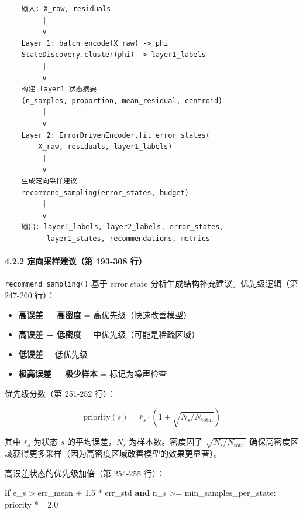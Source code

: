 \documentclass[
  12pt,
]{ctexart}
\newenvironment{Shaded}{}{}
\newcommand{\ControlFlowTok}[1]{\textcolor[rgb]{0.00,0.44,0.13}{\textbf{#1}}}
\newcommand{\FloatTok}[1]{\textcolor[rgb]{0.25,0.63,0.44}{#1}}
\newcommand{\KeywordTok}[1]{\textcolor[rgb]{0.00,0.44,0.13}{\textbf{#1}}}
\newcommand{\NormalTok}[1]{#1}
\newcommand{\OperatorTok}[1]{\textcolor[rgb]{0.40,0.40,0.40}{#1}}
\providecommand{\tightlist}{%
  \setlength{\itemsep}{0pt}\setlength{\parskip}{0pt}}
\begin{document}
\begin{verbatim}
    输入: X_raw, residuals
         |
         v
    Layer 1: batch_encode(X_raw) -> phi
    StateDiscovery.cluster(phi) -> layer1_labels
         |
         v
    构建 layer1 状态摘要
    (n_samples, proportion, mean_residual, centroid)
         |
         v
    Layer 2: ErrorDrivenEncoder.fit_error_states(
        X_raw, residuals, layer1_labels)
         |
         v
    生成定向采样建议
    recommend_sampling(error_states, budget)
         |
         v
    输出: layer1_labels, layer2_labels, error_states,
          layer1_states, recommendations, metrics
\end{verbatim}

\paragraph{4.2.2 定向采样建议（第 193-308
行）}\label{ux5b9aux5411ux91c7ux6837ux5efaux8baeux7b2c-193-308-ux884c}

\texttt{recommend\_sampling()} 基于 error state
分析生成结构补充建议。优先级逻辑（第 247-260 行）：

\begin{itemize}
\tightlist
\item
  \textbf{高误差 + 高密度} = 高优先级（快速改善模型）
\item
  \textbf{高误差 + 低密度} = 中优先级（可能是稀疏区域）
\item
  \textbf{低误差} = 低优先级
\item
  \textbf{极高误差 + 极少样本} = 标记为噪声检查
\end{itemize}

优先级分数（第 251-252 行）：

\[\text{priority}(s) = \bar{r}_s \cdot (1 + \sqrt{N_s / N_{\text{total}}})\]

其中 \(\bar{r}_s\) 为状态 \(s\) 的平均误差，\(N_s\) 为样本数。密度因子
\(\sqrt{N_s / N_{\text{total}}}\)
确保高密度区域获得更多采样（因为高密度区域改善模型的效果更显著）。

高误差状态的优先级加倍（第 254-255 行）：

\begin{Shaded}
\begin{Highlighting}[]
\ControlFlowTok{if}\NormalTok{ e\_s }\OperatorTok{\textgreater{}}\NormalTok{ err\_mean }\OperatorTok{+} \FloatTok{1.5} \OperatorTok{*}\NormalTok{ err\_std }\KeywordTok{and}\NormalTok{ n\_s }\OperatorTok{\textgreater{}=}\NormalTok{ min\_samples\_per\_state:}
\NormalTok{    priority }\OperatorTok{*=} \FloatTok{2.0}
\end{Highlighting}
\end{Shaded}
\end{document}
